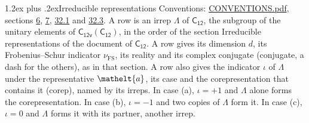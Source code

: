\documentclass[10pt,a4paper]{article}
\makeatletter
\renewcommand\section{\@startsection{section}{1}{\z@}{-3ex plus -1ex minus -.2ex}%
  {1.2ex plus .2ex}{\normalfont\large\sffamily\bfseries\color{parttitle}}}
\numberwithin{equation}{section}
\newcommand{\eltfont}[1]{{\let\sigma\eltsigma\mathelt{#1}}}
\newcommand{\grp}[1]{\mathsf{#1}}
\newcommand{\elt}[1]{\eltfont{#1}}
\newcommand{\fsind}{\nu_{\mathrm{FS}}}
\makeatother
\begin{document}
\section{Irreducible representations}\label{s:irreps}
Conventions: \href{../../CONVENTIONS.pdf}{CONVENTIONS.pdf}, sections \href{../../../rotation/CONVENTIONS.pdf\#conv.6}{6}, \href{../../../rotation/CONVENTIONS.pdf\#conv.7}{7}, \href{../../CONVENTIONS.pdf\#conv.32.1}{32.1} and \href{../../CONVENTIONS.pdf\#conv.32.3}{32.3}.
\leavevmode\label{n:irrep.Delta}A row is an irrep $\Lambda$ of $\grp{C_{12}}$, the subgroup of the unitary elements of $\grp{C_{12v}}(\grp{C_{12}})$, in the order of the section Irreducible representations of the document of \href{../../../rotation/data/pdf/C12.pdf}{$\grp{C_{12}}$}. \label{n:index.dimension}\label{n:index.frobenius}\label{n:head.irrep}\label{n:head.reality}\label{n:head.conjugate}A row gives its dimension $d$, its Frobenius--Schur indicator $\fsind$, its reality and its complex conjugate (conjugate, a dash for the others), as in that section. \label{n:head.case.corep}\label{n:head.corep}A row also gives the indicator $\iota$ of $\Lambda$ under the representative $\elt{a}$, its case and the corepresentation that contains it (corep), named by its irreps. In case (a), $\iota = +1$ and $\Lambda$ alone forms the corepresentation. In case (b), $\iota = -1$ and two copies of $\Lambda$ form it. In case (c), $\iota = 0$ and $\Lambda$ forms it with its partner, another irrep.
\setlength{\emergencystretch}{2em}\par\setlength{\emergencystretch}{0pt}
\end{document}
